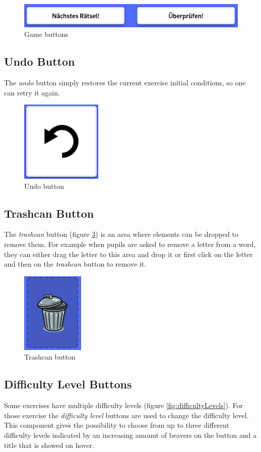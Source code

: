 \begin{figure}[h]
    \centering
    \includegraphics[width=0.5\columnwidth]{figures/game_buttons.png}
    \caption{Game buttons}
    \label{fig:gameButtons} 
\end{figure}

\subsection*{Undo Button}
The \textit{undo} button simply restores the current exercise initial conditions, so one can retry it again.

\begin{figure}[h]
    \centering
    \includegraphics[width=0.1\columnwidth]{figures/undo.png}
    \caption{Undo button}
    \label{fig:undo} 
\end{figure}

\subsection*{Trashcan Button}
The \textit{trashcan} button (figure \ref{fig:trashcan}) is an area where elements can be dropped to remove them. For example when pupils are asked to remove a letter from a word, they can either drag the letter to this area and drop it or first click on the letter and then on the \textit{trashcan} button to remove it.

\begin{figure}[h]
    \centering
    \includegraphics[width=0.1\columnwidth]{figures/trashcan.png}
    \caption{Trashcan button}
    \label{fig:trashcan} 
\end{figure}

\subsection*{Difficulty Level Buttons}
Some exercises have multiple difficulty levels (figure \ref{fig:difficultyLevels}). For those exercise the \textit{difficulty level} buttons are used to change the difficulty level. This component gives the possibility to choose from up to three different difficulty levels indicated by an increasing amount of beavers on the button and a title that is showed on hover.

